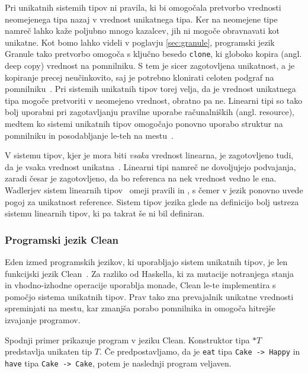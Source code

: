 Pri unikatnih sistemih tipov ni pravila, ki bi omogočala pretvorbo vrednosti neomejenega tipa nazaj v vrednost unikatnega tipa. Ker na neomejene tipe namreč lahko kaže poljubno mnogo kazalcev, jih ni mogoče obravnavati kot unikatne. Kot bomo lahko videli v poglavju \ref{sec:granule}, programski jezik Granule tako pretvorbo omogoča s ključno besedo \texttt{clone}, ki globoko kopira (angl. deep copy) vrednost na pomnilniku. S tem je sicer zagotovljena unikatnost, a je kopiranje precej neučinkovito, saj je potrebno klonirati celoten podgraf na pomnilniku~\cite{marshall2024functional}. Pri sistemih unikatnih tipov torej velja, da je vrednost unikatnega tipa mogoče pretvoriti v neomejeno vrednost, obratno pa ne. Linearni tipi so tako bolj uporabni pri zagotavljanju pravilne uporabe računalniških  (angl. resource), medtem ko sistemi unikatnih tipov omogočajo ponovno uporabo struktur na pomnilniku in posodabljanje le-teh na mestu~\cite{marshall2022linearity}.

V sistemu tipov, kjer je mora biti \textit{vsaka} vrednost linearna, je zagotovljeno tudi, da je vsaka vrednost unikatna~\cite{marshall2022linearity}. Linearni tipi namreč ne dovoljujejo podvajanja, zaradi česar je zagotovljeno, da bo referenca na nek vrednost vedno le ena. Wadlerjev sistem  linearnih tipov~\cite{wadler1990linear} omeji pravili  in , s čemer v jezik ponovno uvede pogoj za unikatnost reference. Sistem tipov jezika glede na definicijo bolj ustreza sistemu linearnih tipov, ki pa takrat še ni bil definiran.

\subsubsection{Programski jezik Clean}

Eden izmed programskih jezikov, ki uporabljajo sistem unikatnih tipov, je len funkcijski jezik Clean~\cite{smetsers1994guaranteeing}. Za razliko od Haskella, ki za mutacije notranjega stanja in vhodno-izhodne operacije uporablja monade, Clean le-te implementira s pomočjo sistema unikatnih tipov. Prav tako zna prevajalnik unikatne vrednosti spreminjati na mestu, kar zmanjša porabo pomnilnika in omogoča hitrejše izvajanje programov.

Spodnji primer prikazuje program v jeziku Clean. Konstruktor tipa $*T$ predstavlja unikaten tip $T$. Če predpostavljamo, da je \texttt{eat} tipa \texttt{Cake -> Happy} in \texttt{have} tipa \texttt{Cake -> Cake}, potem je naslednji program veljaven. 

